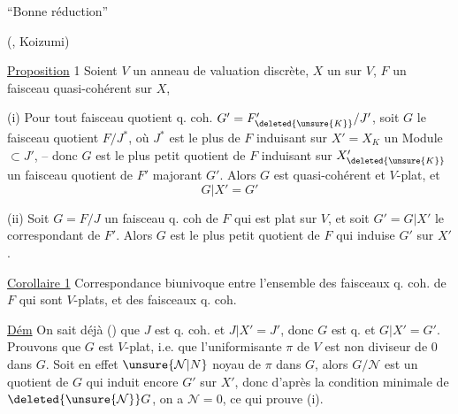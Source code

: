 ``Bonne réduction''

(, Koizumi)

\noindent\hfill{}

\uline{Proposition} 1 Soient $V$ un anneau de valuation
discrète,  $X$ un  sur $V$, $F$ un faisceau
quasi-cohérent sur $X$, 

 (i) Pour tout faisceau quotient q. coh.
$G'=F'_{\deleted{\unsure{K}}}/J'$, soit $G$ le faisceau
quotient  $F/J^*$, où $J^*$ est le plus
 de $F$ induisant 
 sur $X'=X_K$ un  Module $\subset J'$, --
donc $G$ est le plus petit  quotient de $F$
induisant sur \unsure{$\vert$} $X'_{\deleted{\unsure{K}}}$ un  faisceau
quotient de $F'$  majorant $G'$.
Alors $G$ est quasi-cohérent et $V$-plat, et
\[
G|X'=G'
\]

(ii)  Soit $G=F/J$ un
faisceau q. coh de $F$ qui est plat sur $V$,
et soit $G'=G|X'$ le  correspondant
de $F'$. Alors $G$ est le plus petit
 quotient de $F$  qui
induise $G'$ sur $X'$.

\uline{Corollaire 1} Correspondance biunivoque entre
l'ensemble des faisceaux q. coh.  de
$F$ qui sont $V$-plats, et des faisceaux  q. coh.

\uline{Dém} On sait déjà () que $J$ est
q. coh. et $J\vert{}X'=J'$, donc $G$ est q. 
et $G|X'=G'$. Prouvons que $G$ est $V$-plat,
i.e. que l'uniformisante $\pi$ de $V$ est
non diviseur de $0$ dans $G$. 
Soit en effet  $\unsure{\mathcal N|N}$  noyau
de $\pi$ dans $G$, alors $G/\mathcal N$ est un
 quotient  de $G$ qui induit
encore $G'$ sur $X'$, donc d'après la
condition minimale de $\deleted{\unsure{\mathcal N}}G$,  on a $\mathcal N=0$,
ce qui prouve (i).

